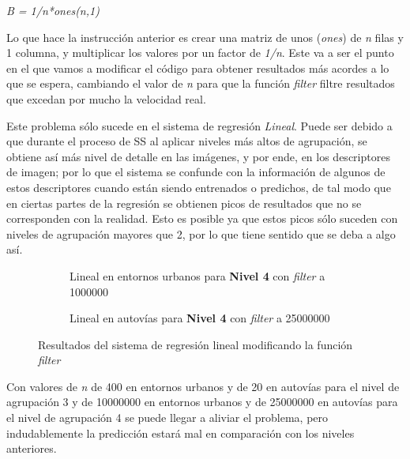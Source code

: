\begin{center}
\textit{B = 1/n*ones(n,1)}
\end{center}

Lo que hace la instrucción anterior es crear una matriz de unos (\textit{ones}) de \textit{n} filas y 1 columna, y multiplicar los valores por un factor de \textit{1/n}. Este va a ser el punto en el que vamos a modificar el código para obtener resultados más acordes a lo que se espera, cambiando el valor de \textit{n} para que la función \textit{filter} filtre resultados que excedan por mucho la velocidad real.

Este problema sólo sucede en el sistema de regresión \textit{Lineal}. Puede ser debido a que durante el proceso de \ac{SS} al aplicar niveles más altos de agrupación, se obtiene así más nivel de detalle en las imágenes, y por ende, en los descriptores de imagen; por lo que el sistema se confunde con la información de algunos de estos descriptores cuando están siendo entrenados o predichos, de tal modo que en ciertas partes de la regresión se obtienen picos de resultados que no se corresponden con la realidad. Esto es posible ya que estos picos sólo suceden con niveles de agrupación mayores que 2, por lo que tiene sentido que se deba a algo así.

\begin{figure}[H]
\centering
  \begin{subfigure}[b]{0.5\linewidth}
    \caption{Lineal en entornos urbanos para \textbf{Nivel 4} con \textit{filter} a 1000000}
  \end{subfigure}
  \begin{subfigure}[b]{0.5\linewidth}
    \caption{Lineal en autovías para \textbf{Nivel 4} con \textit{filter} a 25000000}
  \end{subfigure}
  \caption{Resultados del sistema de regresión lineal modificando la función \textit{filter}}
\end{figure}

Con valores de \textit{n} de 400 en entornos urbanos y de 20 en autovías para el nivel de agrupación 3 y de 10000000 en entornos urbanos y de 25000000 en autovías para el nivel de agrupación 4 se puede llegar a aliviar el problema, pero indudablemente la predicción estará mal en comparación con los niveles anteriores.

